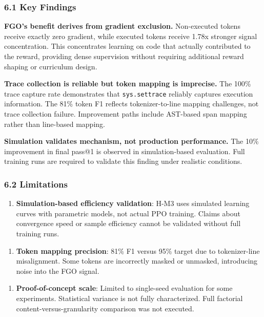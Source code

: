 
\subsubsection{6.1 Key Findings}

\textbf{FGO's benefit derives from gradient exclusion.} Non-executed tokens receive exactly zero gradient, while executed tokens receive 1.78x stronger signal concentration. This concentrates learning on code that actually contributed to the reward, providing dense supervision without requiring additional reward shaping or curriculum design.

\textbf{Trace collection is reliable but token mapping is imprecise.} The 100\% trace capture rate demonstrates that \texttt{sys.settrace} reliably captures execution information. The 81\% token F1 reflects tokenizer-to-line mapping challenges, not trace collection failure. Improvement paths include AST-based span mapping rather than line-based mapping.

\textbf{Simulation validates mechanism, not production performance.} The 10\% improvement in final pass@1 is observed in simulation-based evaluation. Full training runs are required to validate this finding under realistic conditions.

\subsubsection{6.2 Limitations}

\begin{enumerate}
\item \textbf{Simulation-based efficiency validation}: H-M3 uses simulated learning curves with parametric models, not actual PPO training. Claims about convergence speed or sample efficiency cannot be validated without full training runs.
\end{enumerate}

\begin{enumerate}
\item \textbf{Token mapping precision}: 81\% F1 versus 95\% target due to tokenizer-line misalignment. Some tokens are incorrectly masked or unmasked, introducing noise into the FGO signal.
\end{enumerate}

\begin{enumerate}
\item \textbf{Proof-of-concept scale}: Limited to single-seed evaluation for some experiments. Statistical variance is not fully characterized. Full factorial content-versus-granularity comparison was not executed.
\end{enumerate}

